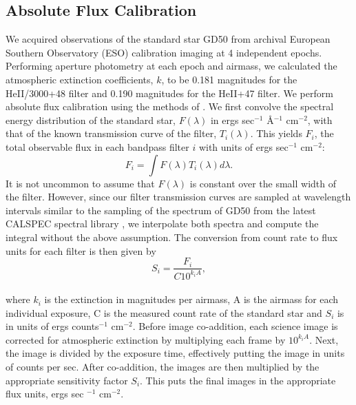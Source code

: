 \documentclass[trackchanges,twocolumn]{aastex62}
\begin{document}
\subsection{Absolute Flux Calibration}
We acquired observations of the standard star GD50 from archival European Southern Observatory (ESO) calibration imaging at 4 independent epochs. Performing aperture photometry at each epoch and airmass, we calculated the atmospheric extinction coefficients, $k$, to be 0.181 magnitudes for the HeII/3000+48 filter and 0.190 magnitudes for the HeII+47 filter. 
We perform absolute flux calibration using the methods of \cite{Jacoby1987}. We first convolve the spectral energy distribution of the standard star, $F(\lambda)$ in ergs sec$^{-1}$ \AA$^{-1}$ cm$^{-2}$, with that of the known transmission curve of the filter, $T_{i}(\lambda)$. This yields $F_i$, the total observable flux in each bandpass filter $i$ with units of ergs sec$^{-1}$ cm$^{-2}$:
\begin{equation*}
F_{i}=\int F(\lambda)T_{i}(\lambda)d\lambda.
\end{equation*}
It is not uncommon to assume that $F(\lambda)$ is constant over the small width of the filter. 
However, since our filter transmission curves are sampled at wavelength intervals similar to the sampling of the spectrum of GD50 from the latest CALSPEC spectral library \citep{Bohlin2017}, we interpolate both spectra and compute the integral without the above assumption. 
The conversion from count rate to flux units for each filter is then given by
\begin{equation*}
S_{i}=\dfrac{F_{i}}{C10^{k_{i}A}},
\end{equation*}\\
where $k_i$ is the extinction in magnitudes per airmass, A is the airmass for each individual exposure, C is the measured count rate of the standard star and $S_i$ is in units of ergs counts$^{-1}$ cm$^{-2}$. Before image co-addition, each science image is corrected for atmospheric extinction by multiplying each frame by $10^{k_{i}A}$. Next, the image is divided by the exposure time, effectively putting the image in units of counts per sec. After co-addition, the images are then multiplied by the appropriate sensitivity factor $S_{i}$. This puts the final images in the appropriate flux units, ergs sec $^{-1}$ cm$^{-2}$.
\end{document}
